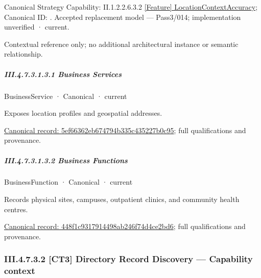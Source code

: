 {\small Canonical Strategy Capability: II.1.2.2.6.3.2 \hyperref[element:84742d2e91364e67ac72cce991bca3a6]{[Feature] LocationContextAccuracy}; Canonical ID: \texttt{}. Accepted replacement model — Pass3/014; implementation unverified · current.}\par
Contextual reference only; no additional architectural instance or semantic relationship.\par
\subparagraph*{III.4.7.3.1.3.1 Business Services}
\label{navigation:III.4.7.3.1.3.1}

\label{navigation:III.4.7.3.1.3.1.1}

\label{element:5ef66362eb674794b335c435227b0c95}
{\small BusinessService · Canonical · current}\par

Exposes location profiles and geospatial addresses.


{\footnotesize \href{../../../../continuum/business/business-service/5ef66362eb674794b335c435227b0c95.md}{Canonical record: 5ef66362eb674794b335c435227b0c95}; full qualifications and provenance.}\par
\subparagraph*{III.4.7.3.1.3.2 Business Functions}
\label{navigation:III.4.7.3.1.3.2}

\label{navigation:III.4.7.3.1.3.2.1}

\label{element:448f1c9317914498ab246f74d4ce2bd6}
{\small BusinessFunction · Canonical · current}\par

Records physical sites, campuses, outpatient clinics, and community health centres.


{\footnotesize \href{../../../../continuum/business/business-function/448f1c9317914498ab246f74d4ce2bd6.md}{Canonical record: 448f1c9317914498ab246f74d4ce2bd6}; full qualifications and provenance.}\par
\subsubsection*{III.4.7.3.2 [CT3] Directory Record Discovery — Capability context}
\label{navigation:III.4.7.3.2}

